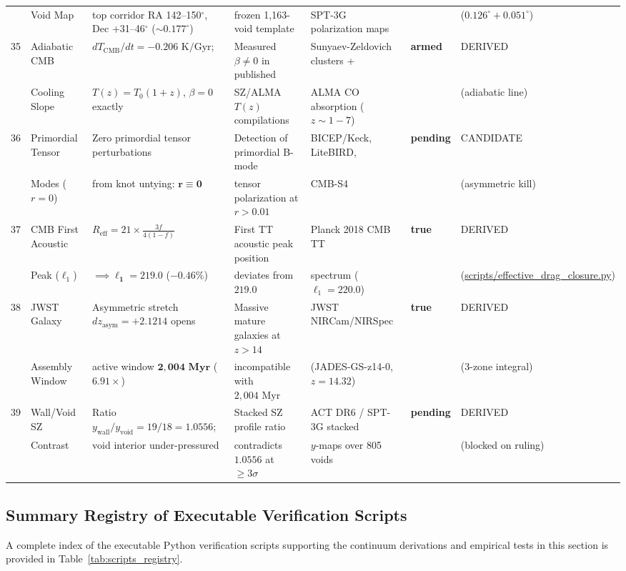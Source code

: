 \documentclass[11pt,a4paper]{article}
\begin{document}
\begin{table}[!htbp]
\begin{tabularx}{\textwidth}{C{0.45cm} L{2.0cm} Y L{2.65cm} L{2.72cm} C{1.2cm} L{2.18cm}}
& Void Map & top corridor RA 142--150$^\circ$, Dec +31--46$^\circ$ ($\sim \mathbf{0.177^\circ}$) & frozen 1,163-void template & SPT-3G polarization maps & & ($0.126^\circ + 0.051^\circ$) \\
35 & Adiabatic CMB & $dT_{\text{CMB}}/dt = -0.206\text{ K/Gyr}$; & Measured $\beta \ne 0$ in published & Sunyaev-Zeldovich clusters + & \textbf{armed} & DERIVED \\
& Cooling Slope & $T(z) = T_0(1+z)$, $\beta = 0$ exactly & SZ/ALMA $T(z)$ compilations & ALMA CO absorption ($z \sim 1-7$) & & (adiabatic line) \\
36 & Primordial Tensor & Zero primordial tensor perturbations & Detection of primordial B-mode & BICEP/Keck, LiteBIRD, & \textbf{pending} & CANDIDATE \\
& Modes ($r=0$) & from knot untying: $\mathbf{r \equiv 0}$ & tensor polarization at $r > 0.01$ & CMB-S4 & & (asymmetric kill) \\
37 & CMB First Acoustic & $R_{\text{eff}} = 21 \times \frac{3f}{4(1-f)}$ & First TT acoustic peak position & Planck 2018 CMB TT & \textbf{true} & DERIVED \\
& Peak ($\ell_1$) & $\implies \mathbf{\ell_1 = 219.0}$ ($-0.46\%$) & deviates from $219.0$ & spectrum ($\ell_1 = 220.0$) & & (\url{scripts/effective_drag_closure.py}) \\
38 & JWST Galaxy & Asymmetric stretch $dz_{\text{asym}} = +2.1214$ opens & Massive mature galaxies at $z > 14$ & JWST NIRCam/NIRSpec & \textbf{true} & DERIVED \\
& Assembly Window & active window $\mathbf{2,004\text{ Myr}}$ ($6.91\times$) & incompatible with $2,004\text{ Myr}$ & (JADES-GS-z14-0, $z=14.32$) & & (3-zone integral) \\
39 & Wall/Void SZ & Ratio $y_{\text{wall}}/y_{\text{void}} = 19/18 = \mathbf{1.0556}$; & Stacked SZ profile ratio & ACT DR6 / SPT-3G stacked & \textbf{pending} & DERIVED \\
& Contrast & void interior under-pressured & contradicts $1.0556$ at $\ge 3\sigma$ & $y$-maps over 805 voids & & (blocked on ruling) \\
\bottomrule
\end{tabularx}
\end{table}


\subsection{Summary Registry of Executable Verification Scripts}
\label{subsec:scripts_summary}
A complete index of the executable Python verification scripts supporting the continuum derivations and empirical tests in this section is provided in Table~\ref{tab:scripts_registry}.
\end{document}

